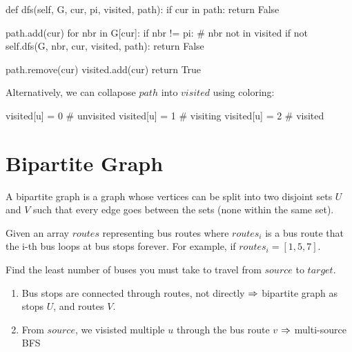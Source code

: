 \begin{python}
def dfs(self, G, cur, pi, visited, path):
  if cur in path:
    return False

  path.add(cur)
  for nbr in G[cur]:
    if nbr != pi:  # nbr not in visited
      if not self.dfs(G, nbr, cur, visited, path):
        return False

  path.remove(cur)
  visited.add(cur)
  return True
\end{python}

Alternatively, we can collapose $path$ into $visited$ using coloring:
\begin{python}
visited[u] = 0  # unvisited
visited[u] = 1  # visiting
visited[u] = 2  # visited
\end{python}

\section{Bipartite Graph}
A bipartite graph is a graph whose vertices can be split into two disjoint sets $U$ and $V$ such that every edge goes between the sets (none within the same set).
\begin{center}
\end{center}
 Given an array $routes$ representing bus routes where $routes_i$ is a bus route that the i-th bus loops at bus stops forever. For example, if $routes_i = [1, 5, 7]$. 

Find the least number of buses you must take to travel from $source$ to $target$.

\begin{enumerate}
\item Bus stops are connected through routes, not directly $\Rightarrow$ bipartite graph as stops $U$, and routes $V$. 
\item From $source$, we visisted multiple $u$ through the bus route $v$ $\Rightarrow$ multi-source BFS
\end{enumerate}


